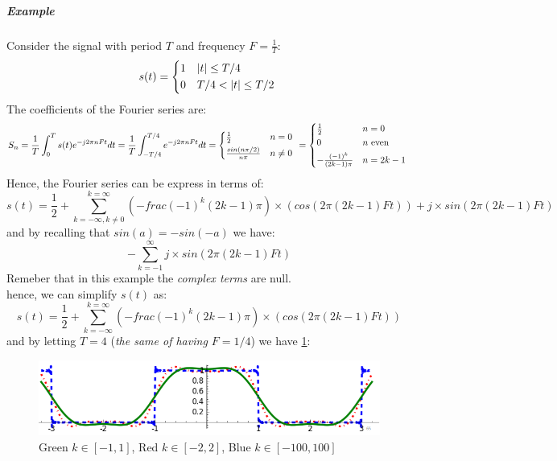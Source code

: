 \documentclass[10pt,a4paper]{report}
\theoremstyle{definition}
\begin{document}
\subparagraph{Example}
\label{fourier-eg2}
Consider the signal with period $T$ and frequency $F = \frac{1}{T}$:
\begin{equation}
	s(t) = 	 \begin{cases*}
		1 & $|t| \leq T/4$ \\
		0  & $T/4 < |t| \leq T/2$
	\end{cases*}
\end{equation}
The coefficients of the Fourier series are:
\begin{equation}
	S_{n} = \frac{1}{T} \int_{0}^{T}s(t)e^{-j2\pi nFt}dt = \frac{1}{T}\int_{-T/4}^{T/4}e^{-j2\pi nFt}dt = \begin{cases*}
		\frac{1}{2} & $n = 0$ \\
		\frac{sin(n\pi /2)}{n\pi}  & $n \neq 0$
	\end{cases*}
	= 	 \begin{cases*}
		\frac{1}{2} & $n = 0$ \\
		0  & $n$ even \\
		-\frac{(-1)^{k}}{(2k-1)\pi} & $n = 2k-1$
	\end{cases*}
\end{equation}
Hence, the Fourier series can be express in terms of:
\begin{equation}
	s(t) = \frac{1}{2} + \sum_{k = - \infty, k \neq 0}^{k = \infty} (-frac{(-1)^{k}}{(2k-1)\pi}) \times (cos(2\pi (2k-1)Ft)) + j \times sin(2\pi(2k-1)Ft)
\end{equation}
and by recalling that $sin(a) = -sin(-a)$ we have:
\begin{equation}
	- \sum_{k=-1}^{\infty} j \times sin(2\pi (2k-1)Ft)
\end{equation}
Remeber that in this example the \textit{complex terms} are null.\\
hence, we can simplify $s(t)$ as:
\begin{equation}
	s(t) = \frac{1}{2} + \sum_{k = - \infty}^{k = \infty} (-frac{(-1)^{k}}{(2k-1)\pi}) \times (cos(2\pi (2k-1)Ft))
\end{equation}
and by letting $T = 4$ (\textit{the same of having $F = 1/4$}) we have \ref{fourier-example2}:
\begin{figure}[h]
	\centering\includegraphics[scale=0.50]{images/Pasted image 20230531165143.png}
	\caption{Green $k \in [-1,1]$, Red $k \in [-2,2]$, Blue $k \in [-100,100]$}
	\label{fourier-example2}
	
\end{figure}
\end{document}

